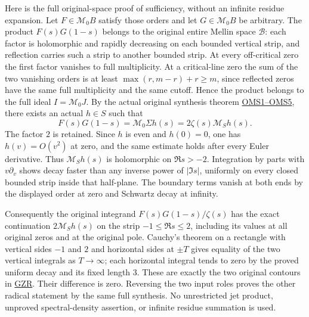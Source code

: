 Here is the full original-space proof of sufficiency, without an
infinite residue expansion. Let \(F\in\mathcal M_0B\) satisfy those
orders and let \(G\in\mathcal M_0B\) be arbitrary. The product
\(F(s)G(1-s)\) belongs to the original entire Mellin space
\(\mathcal B\): each factor is holomorphic and rapidly decreasing on
each bounded vertical strip, and reflection carries such a strip to
another bounded strip. At every off-critical zero the first factor
vanishes to full multiplicity. At a critical-line zero the sum of the
two vanishing orders is at least \(\max(r,m-r)+r\ge m\), since reflected
zeros have the same full multiplicity and the same cutoff. Hence the
product belongs to the full ideal \(I=\mathcal M_0J\). By the actual
original synthesis theorem
\href{https://github.com/KokunoYumeto/zeta-function-research-reader/blob/36a82ecca98addb8a98b48204e349737856c7223/workbenches/splitzero-tandem/continuations/20260924-cohomology-weight-and-character-lifts/original-character-lifting/tau_lifting_weights_20260924/ORIGINAL_MELLIN_SPECTRAL_SYNTHESIS.md}{OMS1--OMS5},
there exists an actual \(h\in S\) such that \[
F(s)G(1-s)=\mathcal M_0\Sigma h(s)
=2\zeta(s)\mathcal M_Sh(s).
\tag{CHC6.7}
\] The factor \(2\) is retained. Since \(h\) is even and \(h(0)=0\), one
has \(h(v)=O(v^2)\) at zero, and the same estimate holds after every
Euler derivative. Thus \(\mathcal M_Sh(s)\) is holomorphic on
\(\Re s>-2\). Integration by parts with \(v\partial_v\) shows decay
faster than any inverse power of \(|\Im s|\), uniformly on every closed
bounded strip inside that half-plane. The boundary terms vanish at both
ends by the displayed order at zero and Schwartz decay at infinity.

Consequently the original integrand \(F(s)G(1-s)/\zeta(s)\) has the
exact continuation \(2\mathcal M_Sh(s)\) on the strip
\(-1\le\Re s\le2\), including its values at all original zeros and at
the original pole. Cauchy's theorem on a rectangle with vertical sides
\(-1\) and \(2\) and horizontal sides at \(\pm T\) gives equality of the
two vertical integrals as \(T\to\infty\); each horizontal integral tends
to zero by the proved uniform decay and its fixed length \(3\). These
are exactly the two original contours in
\href{https://github.com/KokunoYumeto/zeta-function-research-reader/blob/36a82ecca98addb8a98b48204e349737856c7223/workbenches/splitzero-tandem/continuations/20260924-cohomology-weight-and-character-lifts/original-character-lifting/tau_lifting_weights_20260924/GLOBAL_ORIGINAL_ZETA_RESIDUE_DUALITY_INDEPENDENT.md}{GZR}.
Their difference is zero. Reversing the two input roles proves the other
radical statement by the same full synthesis. No unrestricted jet
product, unproved spectral-density assertion, or infinite residue
summation is used.


